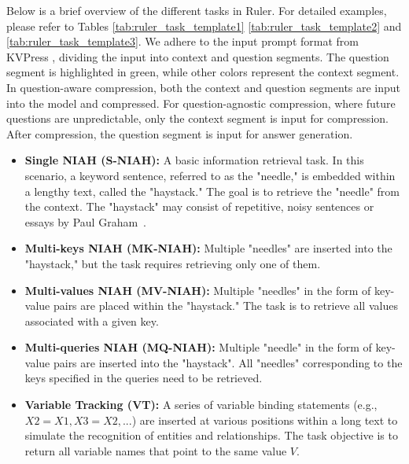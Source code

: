 Below is a brief overview of the different tasks in Ruler. For detailed examples, please refer to Tables \ref{tab:ruler_task_template1} \ref{tab:ruler_task_template2} and \ref{tab:ruler_task_template3}.   We adhere to the input prompt format from KVPress \cite{kvpress}, dividing the input into context and question segments. The question segment is highlighted in green, while other colors represent the context segment. In question-aware compression, both the context and question segments are input into the model and compressed. For question-agnostic compression, where future questions are unpredictable, only the context segment is input for compression. After compression, the question segment is input for answer generation.

\begin{itemize}
	\itemsep0em
	
	\item \textbf{Single NIAH (S-NIAH): } A basic information retrieval task. In this scenario, a keyword sentence, referred to as the "needle," is embedded within a lengthy text, called the "haystack." The goal is to retrieve the "needle" from the context. The "haystack" may consist of repetitive, noisy sentences or essays by Paul Graham~\cite{needle}.
	
	
	\item \textbf{Multi-keys NIAH (MK-NIAH): } Multiple "needles" are inserted into the "haystack," but the task requires retrieving only one of them.
	
	
	
	\item \textbf{Multi-values NIAH (MV-NIAH): } Multiple "needles" in the form of key-value pairs are placed within the "haystack." The task is to retrieve all values associated with a given key.
	
	
	\item \textbf{Multi-queries NIAH (MQ-NIAH): } Multiple "needle" in the form of key-value pairs are inserted into the "haystack". All "needles" corresponding to the keys specified in the queries need to be retrieved. ~\citet{mqar}
	
	
	
	\item \textbf{Variable Tracking (VT): } A series of variable binding statements (e.g., $X2 = X1, X3 = X2, ...$) are inserted at various positions within a long text to simulate the recognition of entities and relationships. The task objective is to return all variable names that point to the same value $V$.
	

\end{itemize}
